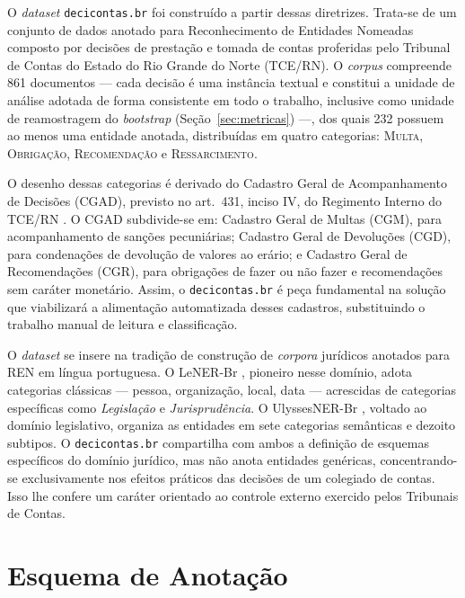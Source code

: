 O \textit{dataset} \texttt{decicontas.br} foi construído a partir dessas diretrizes. Trata-se de um conjunto de dados anotado para Reconhecimento de Entidades Nomeadas composto por decisões de prestação e tomada de contas proferidas pelo Tribunal de Contas do Estado do Rio Grande do Norte (TCE/RN). O \textit{corpus} compreende 861 documentos --- cada decisão é uma instância textual e constitui a unidade de análise adotada de forma consistente em todo o trabalho, inclusive como unidade de reamostragem do \textit{bootstrap} (Seção~\ref{sec:metricas}) ---, dos quais 232 possuem ao menos uma entidade anotada, distribuídas em quatro categorias: \textsc{Multa}, \textsc{Obrigação}, \textsc{Recomendação} e \textsc{Ressarcimento}.

O desenho dessas categorias é derivado do Cadastro Geral de Acompanhamento de Decisões (CGAD), previsto no art.~431, inciso IV, do Regimento Interno do TCE/RN \cite{tcern_regimento}. O CGAD subdivide-se em: Cadastro Geral de Multas (CGM), para acompanhamento de sanções pecuniárias; Cadastro Geral de Devoluções (CGD), para condenações de devolução de valores ao erário; e Cadastro Geral de Recomendações (CGR), para obrigações de fazer ou não fazer e recomendações sem caráter monetário. Assim, o \texttt{decicontas.br} é peça fundamental na solução que viabilizará a alimentação automatizada desses cadastros, substituindo o trabalho manual de leitura e classificação.

O \textit{dataset} se insere na tradição de construção de \textit{corpora} jurídicos anotados para REN em língua portuguesa. O LeNER-Br \cite{Araujo2018}, pioneiro nesse domínio, adota categorias clássicas --- pessoa, organização, local, data --- acrescidas de categorias específicas como \textit{Legislação} e \textit{Jurisprudência}. O UlyssesNER-Br \cite{albuquerque2023ulyssesner}, voltado ao domínio legislativo, organiza as entidades em sete categorias semânticas e dezoito subtipos. O \texttt{decicontas.br} compartilha com ambos a definição de esquemas específicos do domínio jurídico, mas não anota entidades genéricas, concentrando-se exclusivamente nos efeitos práticos das decisões de um colegiado de contas. Isso lhe confere um caráter orientado ao controle externo exercido pelos Tribunais de Contas.

\section{Esquema de Anotação}
\label{sec:esquema_anotacao}

